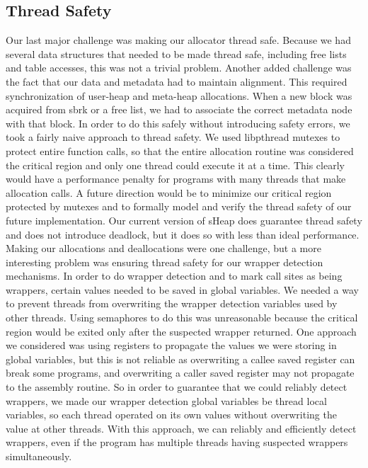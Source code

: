 \documentclass[conference]{IEEEtran}
\begin{document}
\subsection{Thread Safety}
Our last major challenge was making our allocator thread safe. Because we had several 
data structures that needed to be made thread safe, including free lists and table 
accesses, this was not a trivial problem. Another added challenge was the fact that our 
data and metadata had to maintain alignment. This required synchronization of user-heap 
and meta-heap allocations. When a new block was acquired from sbrk or a free list, we 
had to associate the correct metadata node with that block. In order to do this safely 
without introducing safety errors, we took a fairly naive approach to thread safety. 
We used libpthread mutexes to protect entire function calls, so that the entire allocation 
routine was considered the critical region and only one thread could execute it at a time. 
This clearly would have a performance penalty for programs with many threads that make 
allocation calls. A future direction would be to minimize our critical region protected 
by mutexes and to formally model and verify the thread safety of our future implementation. 
Our current version of sHeap does guarantee thread safety and does not introduce deadlock, 
but it does so with less than ideal performance. Making our allocations and deallocations 
were one challenge, but a more interesting problem was ensuring thread safety for our 
wrapper detection mechanisms. In order to do wrapper detection and to mark call sites as 
being wrappers, certain values needed to be saved in global variables. We needed a way to 
prevent threads from overwriting the wrapper detection variables used by other threads. 
Using semaphores to do this was unreasonable because the critical region would be exited 
only after the suspected wrapper returned. One approach we considered was using registers 
to propagate the values we were storing in global variables, but this is not reliable as 
overwriting a callee saved register can break some programs, and overwriting a caller 
saved register may not propagate to the assembly routine. So in order to guarantee that 
we could reliably detect wrappers, we made our wrapper detection global variables be thread 
local variables, so each thread operated on its own values without overwriting the value 
at other threads.  With this approach, we can reliably and efficiently detect wrappers, 
even if the program has multiple threads having suspected wrappers simultaneously.
\end{document}
